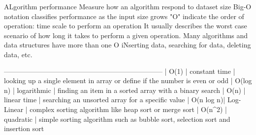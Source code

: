 
ALgorithm performance
Measure how an algorithm respond to dataset size 
Big-O notation 
    classifies performance as the input size grows 
    "O" indicate the order of operation: time scale to perform an operation 
    It usually describes the worst case scenario of how long it takes to perform a given operation.
Many algorithms and data structures have more than one O 
    iNserting data, searching for data, deleting data, etc.


---------------------------------------------------------------------
| O(1)      | constant time | looking up a single element in array  or define if the number is even or odd
| O(log n)  | logarithmic   | finding an item in a sorted array with a binary search 
| O(n)      | linear time   | searching an unsorted array for a  specific value 
| O(n log n)| Log-Linear    | complex sorting algorithm like heap sort or merge sort 
| O(n^2)    | quadratic     | simple sorting algorithm such as bubble sort, selection sort and insertion sort